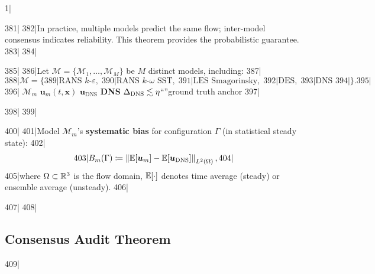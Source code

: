 1|\documentclass[11pt,a4paper]{article}
\begin{document}
381|
382|In practice, multiple models predict the same flow; inter-model consensus indicates reliability. This theorem provides the probabilistic guarantee.
383|
384|\begin{definition}
385|\label{def:ensemble}
386|Let $\mathscr{M} = \{\mathcal{M}_1, \dots, \mathcal{M}_M\}$ be $M$ distinct models, including:
387|\begin{equation}
388|  \mathscr{M} = \{
389|    \text{RANS } k\text{-}\varepsilon,\;
390|    \text{RANS } k\text{-}\omega\text{ SST},\;
391|    \text{LES Smagorinsky},\;
392|    \text{DES},\;
393|    \text{DNS }
394|  \}.
395|\end{equation}
396| $\mathcal{M}_m$  $\bm{u}_m(t, \bm{x})$ $\bm{u}_{\text{DNS}}$ \textbf{ DNS} $\Delta_{\text{DNS}} \lesssim \eta$``''ground truth anchor
397|\end{definition}
398|
399|\begin{definition}
400|\label{def:bias}
401|Model $\mathcal{M}_m$'s \textbf{systematic bias} for configuration $\Gamma$ (in statistical steady state):
402|\begin{equation}\label{eq:bias_def}
403|  B_m(\Gamma) \coloneqq \left\lVert\mathbb{E}[\bm{u}_m] - \mathbb{E}[\bm{u}_{\text{DNS}}]\right\rVert_{L^2(\Omega)},
404|\end{equation}
405|where $\Omega \subset \mathbb{R}^3$ is the flow domain, $\mathbb{E}[\cdot]$ denotes time average (steady) or ensemble average (unsteady).
406|\end{definition}
407|
408|\subsection{Consensus Audit Theorem}
409|
\end{document}

